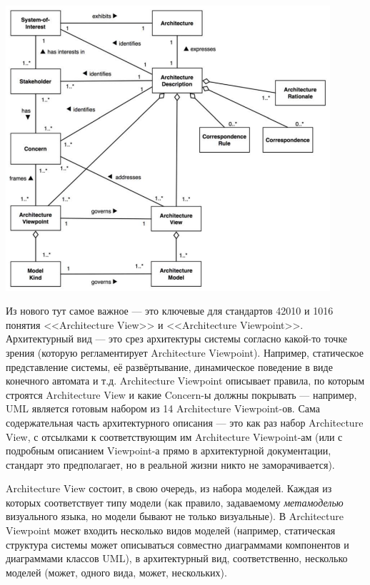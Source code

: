 \documentclass{../mcstext}
\begin{document}
\begin{center}
    \includegraphics[width=0.9\textwidth]{ieee42010ArchitectureDescription.png}
\end{center}

Из нового тут самое важное --- это ключевые для стандартов 42010 и 1016 понятия <<Architecture View>> и <<Architecture Viewpoint>>. Архитектурный вид --- это срез архитектуры системы согласно какой-то точке зрения (которую регламентирует Architecture Viewpoint). Например, статическое представление системы, её развёртывание, динамическое поведение в виде конечного автомата и т.д. Architecture Viewpoint описывает правила, по которым строятся Architecture View и какие Concern-ы должны покрывать --- например, UML является готовым набором из 14 Architecture Viewpoint-ов. Сама содержательная часть архитектурного описания --- это как раз набор Architecture View, с отсылками к соответствующим им Architecture Viewpoint-ам (или с подробным описанием Viewpoint-а прямо в архитектурной документации, стандарт это предполагает, но в реальной жизни никто не заморачивается).

Architecture View состоит, в свою очередь, из набора моделей. Каждая из которых соответствует типу модели (как правило, задаваемому \emph{метамоделью} визуального языка, но модели бывают не только визуальные). В Architecture Viewpoint может входить несколько видов моделей (например, статическая структура системы может описываться совместно диаграммами компонентов и диаграммами классов UML), в архитектурный вид, соответственно, несколько моделей (может, одного вида, может, нескольких). 
\end{document}
